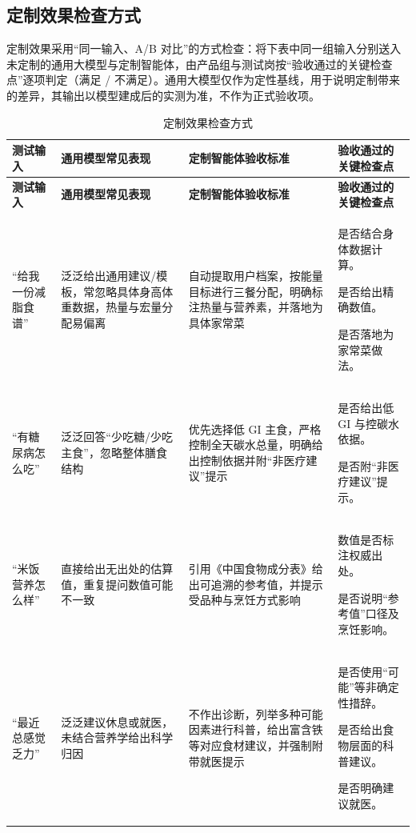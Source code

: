 \documentclass[12pt,a4paper]{ctexart}
\begin{document}
\subsection{定制效果检查方式}

定制效果采用“同一输入、A/B 对比”的方式检查：将下表中同一组输入分别送入未定制的通用大模型与定制智能体，由产品组与测试岗按“验收通过的关键检查点”逐项判定（满足 / 不满足）。通用大模型仅作为定性基线，用于说明定制带来的差异，其输出以模型建成后的实测为准，不作为正式验收项。

{\small\begin{xltabular}{\linewidth}{p{2.0cm}Q{2.8cm}LQ{4.0cm}}
\caption{定制效果检查方式} \\
\toprule
\textbf{测试输入} & \textbf{通用模型常见表现} & \textbf{定制智能体验收标准} & \textbf{验收通过的关键检查点} \\
\midrule
\endfirsthead
\toprule
\textbf{测试输入} & \textbf{通用模型常见表现} & \textbf{定制智能体验收标准} & \textbf{验收通过的关键检查点} \\
\midrule
\endhead
“给我一份减脂食谱” & 泛泛给出通用建议/模板，常忽略具体身高体重数据，热量与宏量分配易偏离 & 自动提取用户档案，按能量目标进行三餐分配，明确标注热量与营养素，并落地为具体家常菜 & \begin{cellenum}\item 是否结合身体数据计算。\item 是否给出精确数值。\item 是否落地为家常菜做法。\end{cellenum} \\
“有糖尿病怎么吃” & 泛泛回答“少吃糖/少吃主食”，忽略整体膳食结构 & 优先选择低 GI 主食，严格控制全天碳水总量，明确给出控制依据并附“非医疗建议”提示 & \begin{cellenum}\item 是否给出低 GI 与控碳水依据。\item 是否附“非医疗建议”提示。\end{cellenum} \\
“米饭营养怎么样” & 直接给出无出处的估算值，重复提问数值可能不一致 & 引用《中国食物成分表》给出可追溯的参考值，并提示受品种与烹饪方式影响 & \begin{cellenum}\item 数值是否标注权威出处。\item 是否说明“参考值”口径及烹饪影响。\end{cellenum} \\
“最近总感觉乏力” & 泛泛建议休息或就医，未结合营养学给出科学归因 & 不作出诊断，列举多种可能因素进行科普，给出富含铁等对应食材建议，并强制附带就医提示 & \begin{cellenum}\item 是否使用“可能”等非确定性措辞。\item 是否给出食物层面的科普建议。\item 是否明确建议就医。\end{cellenum} \\
\bottomrule
\end{xltabular}}
\end{document}
